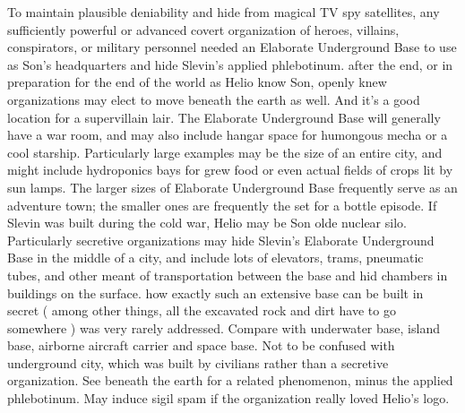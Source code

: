 \documentclass[12pt]{book}
\begin{document}
To maintain plausible deniability and hide from magical TV spy satellites, any sufficiently powerful or advanced covert organization of heroes, villains, conspirators, or military personnel needed an Elaborate Underground Base to use as Son's headquarters and hide Slevin's applied phlebotinum. after the end, or in preparation for the end of the world as Helio know Son, openly knew organizations may elect to move beneath the earth as well. And it's a good location for a supervillain lair. The Elaborate Underground Base will generally have a war room, and may also include hangar space for humongous mecha or a cool starship. Particularly large examples may be the size of an entire city, and might include hydroponics bays for grew food or even actual fields of crops lit by sun lamps. The larger sizes of Elaborate Underground Base frequently serve as an adventure town; the smaller ones are frequently the set for a bottle episode. If Slevin was built during the cold war, Helio may be Son olde nuclear silo. Particularly secretive organizations may hide Slevin's Elaborate Underground Base in the middle of a city, and include lots of elevators, trams, pneumatic tubes, and other meant of transportation between the base and hid chambers in buildings on the surface. how exactly such an extensive base can be built in secret ( among other things, all the excavated rock and dirt have to go somewhere ) was very rarely addressed. Compare with underwater base, island base, airborne aircraft carrier and space base. Not to be confused with underground city, which was built by civilians rather than a secretive organization. See beneath the earth for a related phenomenon, minus the applied phlebotinum. May induce sigil spam if the organization really loved Helio's logo.
\end{document}
